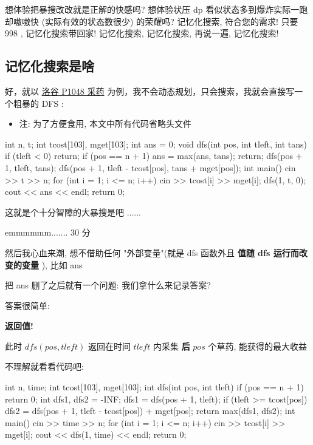 
\begin{QUOTE}{}{}
想体验把暴搜改改就是正解的快感吗? 想体验状压 dp 看似状态多到爆炸实际一跑却嗷嗷快 (实际有效的状态数很少) 的荣耀吗? 记忆化搜索, 符合您的需求! 只要 998 , 记忆化搜索带回家! 记忆化搜索, 记忆化搜索, 再说一遍, 记忆化搜索!
\end{QUOTE}

\hr

\subsection{记忆化搜索是啥}

好，就以 \href{https://www.luogu.org/problemnew/show/P1048}{洛谷 P1048 采药} 为例，我不会动态规划，只会搜索，我就会直接写一个粗暴的  DFS  :

\begin{itemize}
\item 注: 为了方便食用, 本文中所有代码省略头文件
\end{itemize}

\begin{cppcode}
int n, t;
int tcost[103], mget[103];
int ans = 0;
void dfs(int pos, int tleft, int tans) {
  if (tleft < 0) return;
  if (pos == n + 1) {
    ans = max(ans, tans);
    return;
  }
  dfs(pos + 1, tleft, tans);
  dfs(pos + 1, tleft - tcost[pos], tans + mget[pos]);
}
int main() {
  cin >> t >> n;
  for (int i = 1; i <= n; i++) cin >> tcost[i] >> mget[i];
  dfs(1, t, 0);
  cout << ans << endl;
  return 0;
}
\end{cppcode}

这就是个十分智障的大暴搜是吧 ......

emmmmmm....... $30$ 分

然后我心血来潮, 想不借助任何 "外部变量"(就是 dfs 函数外且 \textbf{ 值随 dfs 运行而改变的变量 }), 比如 ans

把 ans 删了之后就有一个问题: 我们拿什么来记录答案?

答案很简单:

\textbf{返回值!}

此时 $dfs(pos,tleft)$ 返回在时间 $tleft$ 内采集 \textbf{ 后 }$pos$ 个草药, 能获得的最大收益

不理解就看看代码吧:

\begin{cppcode}
int n, time;
int tcost[103], mget[103];
int dfs(int pos, int tleft) {
  if (pos == n + 1) return 0;
  int dfs1, dfs2 = -INF;
  dfs1 = dfs(pos + 1, tleft);
  if (tleft >= tcost[pos]) dfs2 = dfs(pos + 1, tleft - tcost[pos]) + mget[pos];
  return max(dfs1, dfs2);
}
int main() {
  cin >> time >> n;
  for (int i = 1; i <= n; i++) cin >> tcost[i] >> mget[i];
  cout << dfs(1, time) << endl;
  return 0;
}
\end{cppcode}

